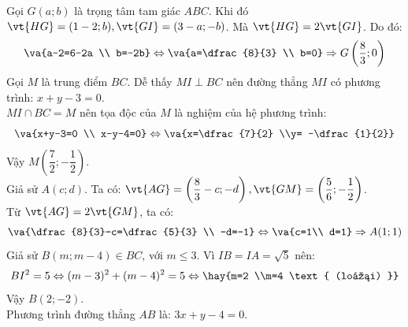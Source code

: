 Gọi $G(a;b)$ là trọng tâm tam giác $ABC$. Khi đó $\vt{HG}=(1-2;b), \vt{GI}=(3-a;-b)$. Mà $\vt{HG}=2\vt{GI}$. Do đó:
$$\va{a-2=6-2a \\ b=-2b} \Leftrightarrow \va{a=\dfrac{8}{3} \\ b=0} \Rightarrow G\left(\dfrac{8}{3};0\right)$$
Gọi $M$ là trung điểm $BC$. Dễ thấy $MI \perp BC$ nên đường thẳng $MI$ có phương trình: $x+y-3=0$.\\
$MI \cap BC = M$ nên tọa độc của $M$ là nghiệm của hệ phương trình:
$$\va{x+y-3=0 \\ x-y-4=0} \Leftrightarrow \va{x=\dfrac{7}{2} \\y= -\dfrac{1}{2}}$$
Vậy $M \left(\dfrac{7}{2};-\dfrac{1}{2} \right)$.\\
Giả sử $A(c;d)$. Ta có: $\vt{AG} = \left(\dfrac{8}{3}-c;-d\right), \vt{GM} =  \left(\dfrac{5}{6};-\dfrac{1}{2}\right)$.\\ Từ $\vt{AG}=2\vt{GM}$, ta có:
$$\va{\dfrac{8}{3}-c=\dfrac{5}{3} \\ -d=-1} \Leftrightarrow \va{c=1\\ d=1} \Rightarrow A(1;1)$$
Giả sử $B(m;m-4) \in BC$, với $m \leq 3$. Vì $IB=IA=\sqrt{5}$ nên:
$$BI^2=5 \Leftrightarrow (m-3)^2+(m-4)^2=5 \Leftrightarrow \hay{m=2 \\m=4 \text{ (loại) }}$$
Vậy $B(2;-2)$.\\
Phương trình đường thẳng $AB$ là: $3x+y-4=0$.

